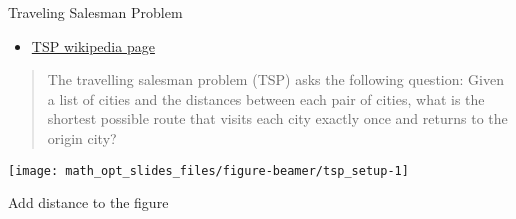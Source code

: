 \documentclass[
  ignorenonframetext,
]{beamer}
\providecommand{\tightlist}{%
  \setlength{\itemsep}{0pt}\setlength{\parskip}{0pt}}
\begin{document}
\begin{frame}{Traveling Salesman Problem}
\protect\hypertarget{traveling-salesman-problem}{}

\begin{itemize}
\tightlist
\item
  \href{https://en.wikipedia.org/wiki/Travelling_salesman_problem}{TSP
  wikipedia page}
\end{itemize}

\begin{quote}
The travelling salesman problem (TSP) asks the following question: Given
a list of cities and the distances between each pair of cities, what is
the shortest possible route that visits each city exactly once and
returns to the origin city?
\end{quote}

\begin{center}\texttt{[image: math\_opt\_slides\_files/figure-beamer/tsp\_setup-1]} \end{center}

\end{frame}

\begin{frame}{}
\protect\hypertarget{section}{}

Add distance to the figure

\end{frame}
\end{document}
